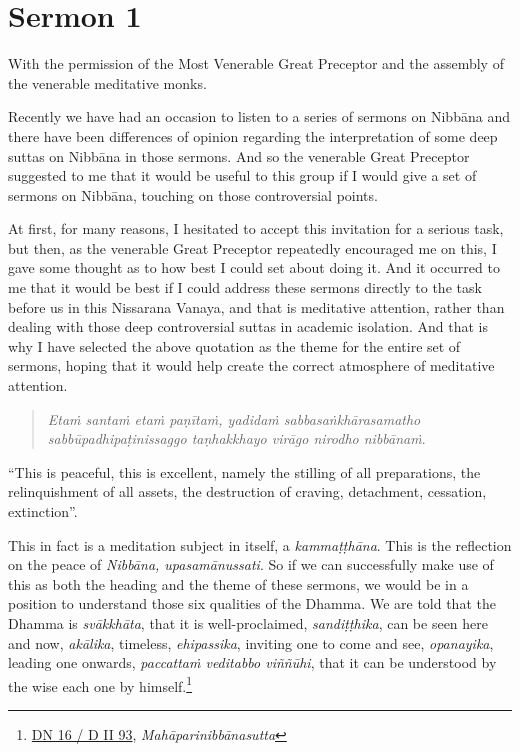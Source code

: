 \chapter{Sermon 1}

\NibbanaOpeningQuote

With the permission of the Most Venerable Great Preceptor and the assembly of the venerable meditative monks.

Recently we have had an occasion to listen to a series of sermons on Nibbāna and there have been differences of opinion regarding the interpretation of some deep suttas on Nibbāna in those sermons. And so the venerable Great Preceptor suggested to me that it would be useful to this group if I would give a set of sermons on Nibbāna, touching on those controversial points.

At first, for many reasons, I hesitated to accept this invitation for a serious task, but then, as the venerable Great Preceptor repeatedly encouraged me on this, I gave some thought as to how best I could set about doing it. And it occurred to me that it would be best if I could address these sermons directly to the task before us in this Nissarana Vanaya, and that is meditative attention, rather than dealing with those deep controversial suttas in academic isolation. And that is why I have selected the above quotation as the theme for the entire set of sermons, hoping that it would help create the correct atmosphere of meditative attention.

\begin{quote}
\emph{Etaṁ santaṁ etaṁ paṇītaṁ, yadidaṁ sabbasaṅkhārasamatho sabbūpadhipaṭinissaggo taṇhakkhayo virāgo nirodho nibbānaṁ}.
\end{quote}

``This is peaceful, this is excellent, namely the stilling of all preparations, the relinquishment of all assets, the destruction of craving, detachment, cessation, extinction''.

This in fact is a meditation subject in itself, a \emph{kammaṭṭhāna}. This is the reflection on the peace of \emph{Nibbāna, upasamānussati}. So if we can successfully make use of this as both the heading and the theme of these sermons, we would be in a position to understand those six qualities of the Dhamma. We are told that the Dhamma is \emph{svākkhāta}, that it is well-proclaimed, \emph{sandiṭṭhika}, can be seen here and now, \emph{akālika}, timeless, \emph{ehipassika}, inviting one to come and see, \emph{opanayika}, leading one onwards, \emph{paccattaṁ veditabbo viññūhi}, that it can be understood by the wise each one by himself.\footnote{\href{https://suttacentral.net/dn16/pli/ms}{DN 16 / D II 93}, \emph{Mahāparinibbānasutta}}

